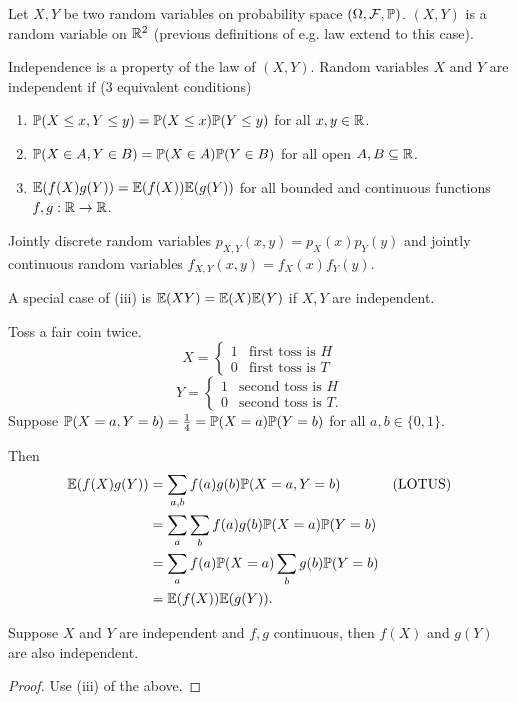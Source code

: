 \documentclass[10pt, a4paper]{article}
\begin{document}
Let $X, Y$ be two random variables on probability space $(\Omega, \mathcal{F},\P)$.
$(X, Y)$ is a random variable on $\R ^ 2$
(previous definitions of e.g. law extend to this case).

Independence is a property of the law of $(X, Y)$.
Random variables $X$ and $Y$ are independent if
($3$ equivalent conditions)
\begin{enumerate}[label = (\roman*)]
    \item $\P(X \leq x, Y \leq y) = \P(X \leq x)\P(Y \leq y)$ for all $x, y \in \R$.

    \item $\P(X \in A, Y \in B) = \P(X \in A)\P(Y \in B)$ for all open $A, B \subseteq \R$.

    \item $\E(f(X)g(Y)) = \E(f(X))\E(g(Y))$ for all bounded and continuous functions $f, g : \R \to \R$.
\end{enumerate}

Jointly discrete random variables $p_{X, Y}(x, y) = p_{X}(x)p_{Y}(y)$ and jointly continuous random variables $f_{X, Y}(x, y) = f_{X}(x)f_{Y}(y)$.

A special case of
(iii)
is $\E(XY) = \E(X)\E(Y)$ if $X, Y$ are independent.

\begin{example}
    Toss a fair coin twice.
    \[
    X = \begin{cases}
        1 &\text{first toss is $H$} \\
        0 &\text{first toss is $T$}
    \end{cases}
    \]
    \[
    Y = \begin{cases}
        1 &\text{second toss is $H$} \\
        0 &\text{second toss is $T$}.
    \end{cases}
    \]
    Suppose $\P(X = a, Y = b) = \frac{1}{4} = \P(X = a)\P(Y = b)$ for all $a, b \in \{0, 1\}$.

    Then
    \begin{align*}
        \E(f(X)g(Y)) &= \sum_{a, b}f(a)g(b)\P(X = a, Y = b) &&\text{(LOTUS)} \\
        &= \sum_{a}\sum_{b}f(a)g(b)\P(X = a)\P(Y = b) \\
        &= \sum_{a}f(a)\P(X = a)\sum_{b}g(b)\P(Y = b) \\
        &= \E(f(X))\E(g(Y)).
    \end{align*}
\end{example}

\begin{lemma}
    Suppose $X$ and $Y$ are independent and $f, g$ continuous,
    then $f(X)$ and $g(Y)$ are also independent.
    
    \begin{proof}
        Use
        (iii)
        of the above.
    \end{proof}
\end{lemma}
\end{document}
